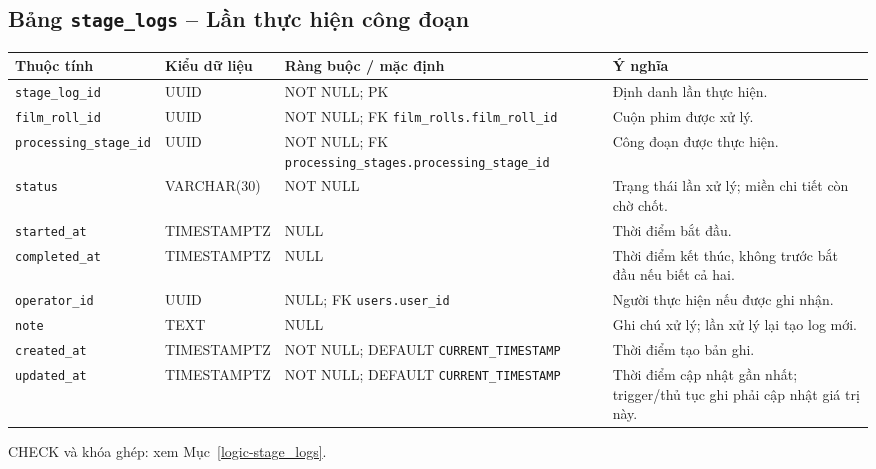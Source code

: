 \subsection{Bảng \texttt{stage\_\allowbreak{}logs} -- Lần thực hiện công đoạn}
\label{dictionary-stage_logs}
\begingroup
\footnotesize
\setlength{\tabcolsep}{3pt}
\begin{longtable}{>{\raggedright\arraybackslash}p{3.1cm}>{\raggedright\arraybackslash}p{2.5cm}>{\raggedright\arraybackslash}p{3.7cm}>{\raggedright\arraybackslash}p{4.3cm}}
\toprule
Thuộc tính & Kiểu dữ liệu & Ràng buộc / mặc định & Ý nghĩa \\
\midrule
\endhead
\texttt{stage\_\allowbreak{}log\_\allowbreak{}id} & UUID & NOT NULL; PK & Định danh lần thực hiện. \\
\texttt{film\_\allowbreak{}roll\_\allowbreak{}id} & UUID & NOT NULL; FK \texttt{film\_\allowbreak{}rolls.film\_\allowbreak{}roll\_\allowbreak{}id} & Cuộn phim được xử lý. \\
\texttt{processing\_\allowbreak{}stage\_\allowbreak{}id} & UUID & NOT NULL; FK \texttt{processing\_\allowbreak{}stages.processing\_\allowbreak{}stage\_\allowbreak{}id} & Công đoạn được thực hiện. \\
\texttt{status} & VARCHAR(30) & NOT NULL & Trạng thái lần xử lý; miền chi tiết còn chờ chốt. \\
\texttt{started\_\allowbreak{}at} & TIMESTAMPTZ & NULL & Thời điểm bắt đầu. \\
\texttt{completed\_\allowbreak{}at} & TIMESTAMPTZ & NULL & Thời điểm kết thúc, không trước bắt đầu nếu biết cả hai. \\
\texttt{operator\_\allowbreak{}id} & UUID & NULL; FK \texttt{users.user\_\allowbreak{}id} & Người thực hiện nếu được ghi nhận. \\
\texttt{note} & TEXT & NULL & Ghi chú xử lý; lần xử lý lại tạo log mới. \\
\texttt{created\_\allowbreak{}at} & TIMESTAMPTZ & NOT NULL; DEFAULT \texttt{CURRENT\_\allowbreak{}TIMESTAMP} & Thời điểm tạo bản ghi. \\
\texttt{updated\_\allowbreak{}at} & TIMESTAMPTZ & NOT NULL; DEFAULT \texttt{CURRENT\_\allowbreak{}TIMESTAMP} & Thời điểm cập nhật gần nhất; trigger/thủ tục ghi phải cập nhật giá trị này. \\
\bottomrule
\end{longtable}
\endgroup
CHECK và khóa ghép: xem Mục~\ref{logic-stage_logs}.
